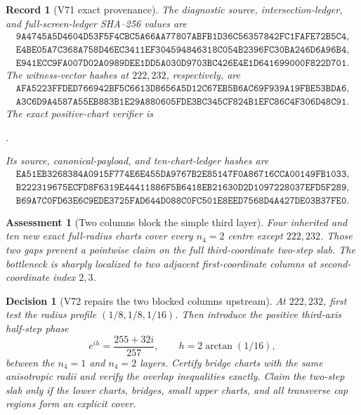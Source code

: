 \documentclass[11pt,oneside]{article}
\newtheorem{assessment}[theorem]{Assessment}
\newtheorem{record}[theorem]{Record}
\newtheorem{decision}[theorem]{Decision}
\theoremstyle{definition}
\theoremstyle{remark}
\begin{document}
\begin{record}[V71 exact provenance]
\label{rec:newv71-provenance}
The diagnostic source, intersection-ledger, and full-screen-ledger
SHA--256 values are
\[
\begin{gathered}
\texttt{9A4745A5D4604D53F5F4CBC5A66AA77807ABFB1D36C56357842FC1FAFE72B5C4},\\
\texttt{E4BE05A7C368A758D46EC3411EF304594846318C054B2396FC30BA246D6A96B4},\\
\texttt{E941ECC9FA007D02A0989DEE1DD5A030D9703BC426E4E1D641699000F822D701}.
\end{gathered}                                        \tag{71.8}
\]
The witness-vector hashes at \(222,232\), respectively, are
\[
\begin{gathered}
\texttt{AFA5223FFDED766942BF5C6613D8656A5D12C67EB5B6AC69F939A19FBE53BDA6},\\
\texttt{A3C6D9A4587A55EB883B1E29A880605FDE3BC345CF824B1EFC86C4F306D48C91}.
\end{gathered}                                        \tag{71.9}
\]
The exact positive-chart verifier is
\begin{center}
\footnotesize
{}.
\end{center}
Its source, canonical-payload, and ten-chart-ledger hashes are
\[
\begin{gathered}
\texttt{EA51EB3268384A0915F774E6E455DA9767B2E85147F0A86716CCA00149FB1033},\\
\texttt{B222319675ECFD8F6319E44411886F5B6418EB21630D2D1097228037EFD5F289},\\
\texttt{B69A7C0FD63E6C9EDE3725FAD644D088C0FC501E8EED7568D4A427DE03B37FE0}.
\end{gathered}                                        \tag{71.10}
\]
\end{record}

\begin{assessment}[Two columns block the simple third layer]
\label{ass:newv71}
Four inherited and ten new exact full-radius charts cover every
\(n_4=2\) centre except \(222,232\).  Those two gaps prevent a
pointwise claim on the full third-coordinate two-step slab.  The
bottleneck is sharply localized to two adjacent first-coordinate
columns at second-coordinate index \(2,3\).
\end{assessment}

\begin{decision}[V72 repairs the two blocked columns upstream]
\label{dec:newv71-next}
At \(222,232\), first test the radius profile
\((1/8,1/8,1/16)\).  Then introduce the positive third-axis
half-step phase
\[
 e^{ih}=\frac{255+32i}{257},\qquad h=2\arctan(1/16),  \tag{71.11}
\]
between the \(n_4=1\) and \(n_4=2\) layers.  Certify bridge charts
with the same anisotropic radii and verify the overlap inequalities
exactly.  Claim the two-step slab only if the lower charts, bridges,
small upper charts, and all transverse cap regions form an explicit
cover.
\end{decision}
\end{document}
